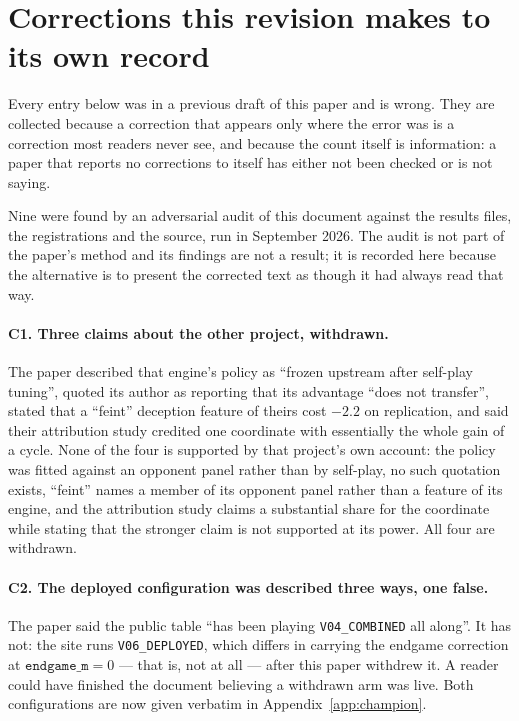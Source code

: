
\section{Corrections this revision makes to its own record}
\label{app:corrections}

Every entry below was in a previous draft of this paper and is wrong. They are
collected because a correction that appears only where the error was is a
correction most readers never see, and because the count itself is
information: a paper that reports no corrections to itself has either not been
checked or is not saying.

Nine were found by an adversarial audit of this document against the results
files, the registrations and the source, run in September 2026. The audit is
not part of the paper's method and its findings are not a result; it is
recorded here because the alternative is to present the corrected text as
though it had always read that way.

\paragraph{C1. Three claims about the other project, withdrawn.} The paper
described that engine's policy as ``frozen upstream after self-play tuning'',
quoted its author as reporting that its advantage ``does not transfer'', stated
that a ``feint'' deception feature of theirs cost $-2.2$ on replication, and
said their attribution study credited one coordinate with essentially the whole
gain of a cycle. None of the four is supported by that project's own account:
the policy was fitted against an opponent panel rather than by self-play, no
such quotation exists, ``feint'' names a member of its opponent panel rather
than a feature of its engine, and the attribution study claims a substantial
share for the coordinate while stating that the stronger claim is not supported
at its power. All four are withdrawn.

\paragraph{C2. The deployed configuration was described three ways, one false.}
The paper said the public table ``has been playing \texttt{V04\_COMBINED} all
along''. It has not: the site runs \texttt{V06\_DEPLOYED}, which differs in
carrying the endgame correction at $\texttt{endgame\_m} = 0$ --- that is, not at
all --- after this paper withdrew it. A reader could have finished the document
believing a withdrawn arm was live. Both configurations are now given verbatim
in Appendix~\ref{app:champion}.

